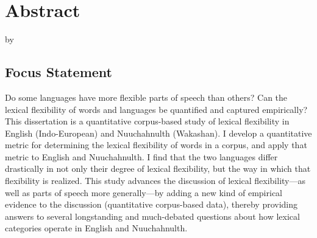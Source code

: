 \section*{Abstract}
\label{sec:abstract}

\begin{center}

  \doctitle

  by

  \theauthor

\end{center}

\subsection*{Focus Statement}

Do some languages have more flexible parts of speech than others? Can the lexical flexibility of words and languages be quantified and captured empirically? This dissertation is a quantitative corpus-based study of lexical flexibility in English (Indo-European) and Nuuchahnulth (Wakashan). I develop a quantitative metric for determining the lexical flexibility of words in a corpus, and apply that metric to English and Nuuchahnulth. I find that the two languages differ drastically in not only their degree of lexical flexibility, but the way in which that flexibility is realized. This study advances the discussion of lexical flexibility---as well as parts of speech more generally---by adding a new kind of empirical evidence to the discussion (quantitative corpus-based data), thereby providing answers to  several longstanding and much-debated questions about how lexical categories operate in English and Nuuchahnulth.

